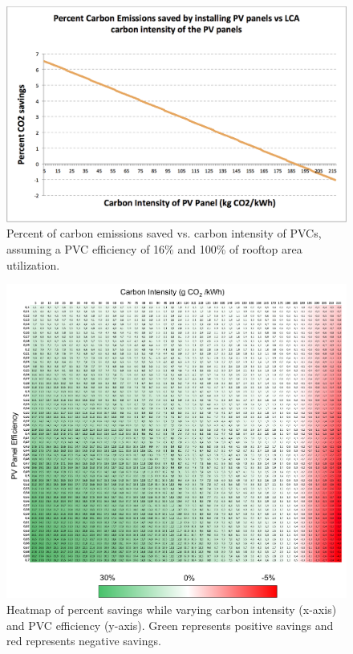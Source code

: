 \begin{figure}
\begin{center}
\includegraphics[scale=0.5]{pics/d7.png}
\caption{Percent of carbon emissions saved vs. carbon intensity of PVCs, assuming a PVC efficiency of 16\% and 100\% of rooftop area utilization.}
\label{d7}
\end{center}
\end{figure}


\begin{figure}
\begin{center}
\includegraphics[scale=0.8]{pics/d8.png}
\caption{Heatmap of percent savings while varying carbon intensity (x-axis) and PVC efficiency (y-axis). Green represents positive savings and red represents negative savings.}
\label{d8}
\end{center}
\end{figure}


